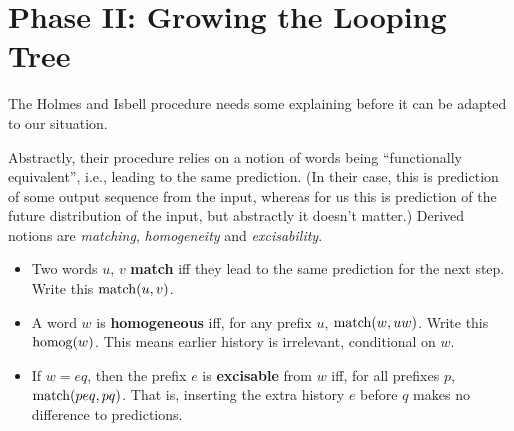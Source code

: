 \documentclass[../new-procedure.tex]{subfiles}
\begin{document}
\section{Phase II: Growing the Looping Tree}

The Holmes and Isbell procedure needs some explaining before it can be adapted
to our situation.

Abstractly, their procedure relies on a notion of words being ``functionally
equivalent'', i.e., leading to the same prediction.  (In their case, this is
prediction of some output sequence from the input, whereas for us this is
prediction of the future distribution of the input, but abstractly it doesn't
matter.)  Derived notions are {\em matching}, {\em homogeneity} and {\em
  excisability}.
\begin{itemize}
\item Two words $u$, $v$ {\bf match} iff they lead to the same prediction for
  the next step.  Write this $\mathrm{match}(u,v)$.
\item A word $w$ is {\bf homogeneous} iff, for any prefix $u$, $\mathrm{match}(w,uw)$.
  Write this $\mathrm{homog}(w)$.  This means earlier history is irrelevant,
  conditional on $w$.
\item If $w=eq$, then the prefix $e$ is {\bf excisable} from $w$ iff, for all
  prefixes $p$, $\mathrm{match}(peq, pq)$.  That is, inserting the extra history $e$
  before $q$ makes no difference to predictions.
\end{itemize}
\end{document}
